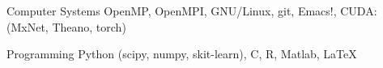 

\begin{cvskills}


  \cvskill
    {Computer Systems} %
    {OpenMP, OpenMPI, GNU/Linux, git, Emacs!, CUDA: (MxNet, Theano, torch)} %

  \cvskill
    {Programming} %
    {Python (scipy, numpy, skit-learn), C, R, Matlab, \LaTeX} %
    
\end{cvskills}
